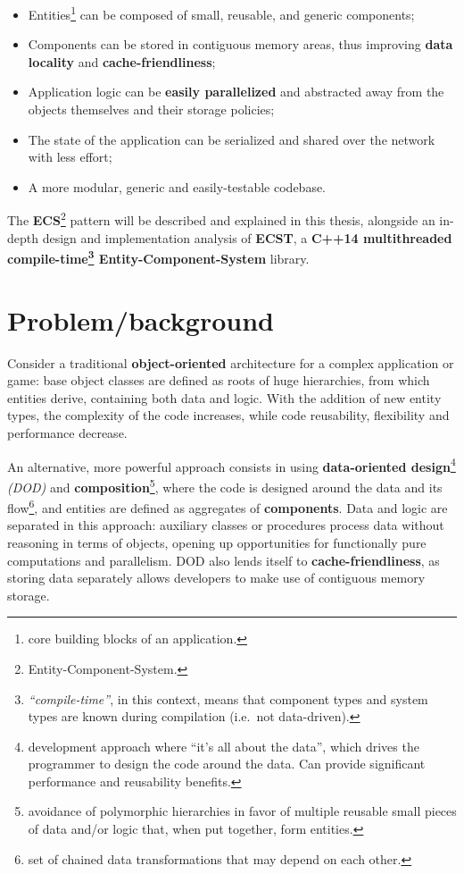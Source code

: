 \documentclass[oneside, 12pt, a4paper, openany]{book}
\begin{document}
\begin{itemize}
\item
  Entities\footnote{core building blocks of an application.} can be
  composed of small, reusable, and generic components;
\item
  Components can be stored in contiguous memory areas, thus improving
  \textbf{data locality} and \textbf{cache-friendliness};
\item
  Application logic can be \textbf{easily parallelized} and abstracted
  away from the objects themselves and their storage policies;
\item
  The state of the application can be serialized and shared over the
  network with less effort;
\item
  A more modular, generic and easily-testable codebase.
\end{itemize}

The \textbf{ECS}\footnote{Entity-Component-System.} pattern will be
described and explained in this thesis, alongside an in-depth design and
implementation analysis of \textbf{ECST}, a \textbf{C++14 multithreaded
compile-time\footnote{\emph{``compile-time''}, in this context, means
  that component types and system types are known during compilation
  (i.e.~not data-driven).} Entity-Component-System} library.

\section{Problem/background}\label{problembackground}

Consider a traditional \textbf{object-oriented} architecture for a
complex application or game: base object classes are defined as roots of
huge hierarchies, from which entities derive, containing both data and
logic. With the addition of new entity types, the complexity of the code
increases, while code reusability, flexibility and performance decrease.

An alternative, more powerful approach consists in using
\textbf{data-oriented design}\footnote{development approach where ``it's
  all about the data'', which drives the programmer to design the code
  around the data. Can provide significant performance and reusability
  benefits.} \emph{(DOD)} and \textbf{composition}\footnote{avoidance of
  polymorphic hierarchies in favor of multiple reusable small pieces of
  data and/or logic that, when put together, form entities.}, where the
code is designed around the data and its flow\footnote{set of chained
  data transformations that may depend on each other.}, and entities are
defined as aggregates of \textbf{components}. Data and logic are
separated in this approach: auxiliary classes or procedures process data
without reasoning in terms of objects, opening up opportunities for
functionally pure computations and parallelism. DOD also lends itself to
\textbf{cache-friendliness}, as storing data separately allows
developers to make use of contiguous memory storage.
\end{document}
